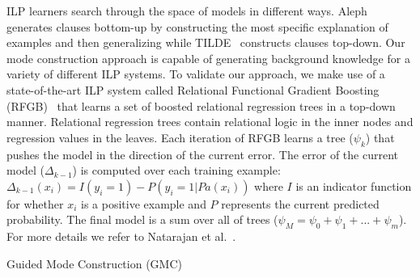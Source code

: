 \documentclass[sigconf]{acmart}
\newcommand{\algrule}[1][.2pt]{\par\vskip.5\baselineskip\hrule height #1\par\vskip.5\baselineskip}
\begin{document}
ILP learners search through the space of models in different ways. Aleph~\cite{aleph} generates clauses bottom-up by constructing the most specific explanation of examples and then generalizing while TILDE~\cite{tilde} constructs clauses top-down. Our mode construction approach is capable of generating background knowledge for a variety of different ILP systems. To validate our approach, we make use of a state-of-the-art ILP system called Relational Functional Gradient Boosting (RFGB)~\cite{boostingMLJ12} that learns a set of boosted relational regression trees in a top-down manner. Relational regression trees contain relational logic in the inner nodes and regression values in the leaves. Each iteration of RFGB learns a tree ($\psi_k$) that pushes the model in the direction of the current error. The error of the current model ($\Delta_{k-1}$) is computed over each training example: $\Delta_{k-1}(x_i) = I(y_i=1) - P(y_i=1| Pa(x_i))$ where $I$ is an indicator function for whether $x_i$ is a positive example and $P$ represents the current predicted probability. The final model is a sum over all of trees ($\psi_M=\psi_0+\psi_1+...+\psi_m$). For more details we refer to Natarajan et al.~\cite{boostingMLJ12}.

\begin{algorithm}[t!]
\caption{Guided Mode Construction (\textsc{GMC})}
\label{algo:gmc}
\end{algorithm}
\end{document}
